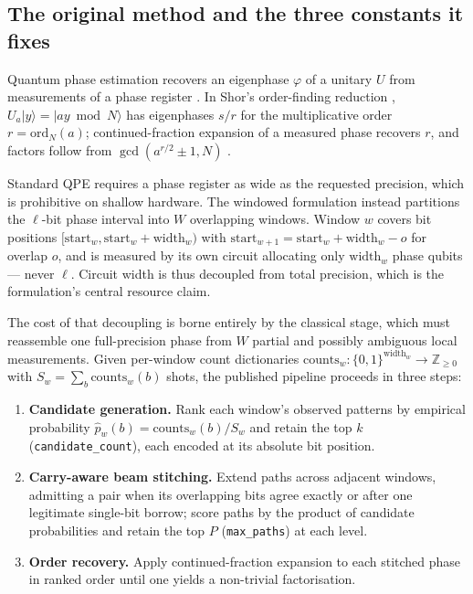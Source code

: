 \documentclass[final,5p,times,longtitle]{elsarticle}
\begin{document}
\subsection{The original method and the three constants it fixes}
\label{sec:baseline}

Quantum phase estimation recovers an eigenphase $\varphi$ of a unitary
$U$ from measurements of a phase register \cite{kitaev1995,cleve1998}.
In Shor's order-finding reduction \cite{shor1997}, $U_a\lvert
y\rangle=\lvert ay \bmod N\rangle$ has eigenphases $s/r$ for the
multiplicative order $r=\mathrm{ord}_N(a)$; continued-fraction expansion
of a measured phase recovers $r$, and factors follow from
$\gcd(a^{r/2}\pm1,N)$ \cite{nielsenchuang}.

Standard QPE requires a phase register as wide as the requested
precision, which is prohibitive on shallow hardware. The windowed
formulation \cite{wqpe2025,modularshor2025} instead partitions the
$\ell$-bit phase interval into $W$ overlapping windows. Window $w$
covers bit positions $[\mathrm{start}_w,\mathrm{start}_w+\mathrm{width}_w)$
with $\mathrm{start}_{w+1}=\mathrm{start}_w+\mathrm{width}_w-o$ for
overlap $o$, and is measured by its own circuit allocating only
$\mathrm{width}_w$ phase qubits --- never $\ell$. Circuit width is thus
decoupled from total precision, which is the formulation's central
resource claim.

The cost of that decoupling is borne entirely by the classical stage,
which must reassemble one full-precision phase from $W$ partial and
possibly ambiguous local measurements. Given per-window count
dictionaries $\mathrm{counts}_w:\{0,1\}^{\mathrm{width}_w}\to
\mathbb{Z}_{\geq0}$ with $S_w=\sum_b \mathrm{counts}_w(b)$ shots, the
published pipeline proceeds in three steps:

\begin{enumerate}\itemsep1pt
\item \textbf{Candidate generation.} Rank each window's observed patterns
by empirical probability $\hat p_w(b)=\mathrm{counts}_w(b)/S_w$ and
retain the top $k$ (\texttt{candidate\_count}), each encoded at its
absolute bit position.
\item \textbf{Carry-aware beam stitching.} Extend paths across adjacent
windows, admitting a pair when its overlapping bits agree exactly or
after one legitimate single-bit borrow; score paths by the product of
candidate probabilities and retain the top $P$ (\texttt{max\_paths}) at
each level.
\item \textbf{Order recovery.} Apply continued-fraction expansion to each
stitched phase in ranked order until one yields a non-trivial
factorisation.
\end{enumerate}
\end{document}
